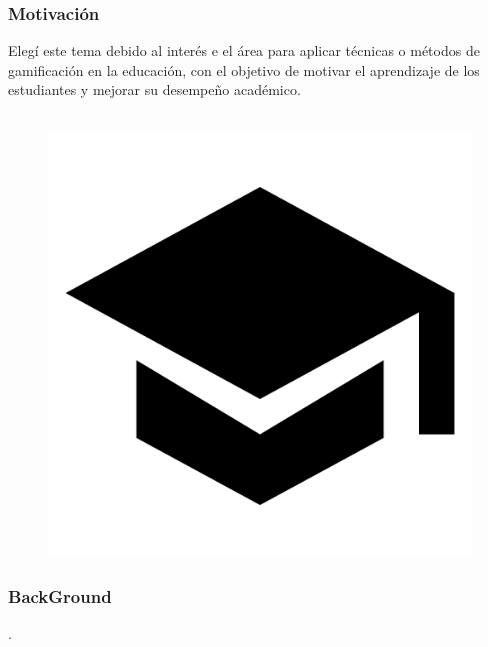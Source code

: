 \documentclass{beamer}
\begin{document}
\begin{frame}
	\frametitle{Motivación}
	Elegí este tema debido al interés e el área para aplicar técnicas o métodos de gamificación en la educación, con el objetivo de motivar el aprendizaje de los estudiantes y mejorar su desempeño académico.
	\\~\\
	
	\begin{figure}
		\begin{center}
			\includegraphics[scale=0.1]{images/2icons/student.png}
		\end{center}
	\end{figure}
\end{frame}

\begin{frame}
	\frametitle{BackGround}
	.\\~\\
\end{frame}
\end{document}
